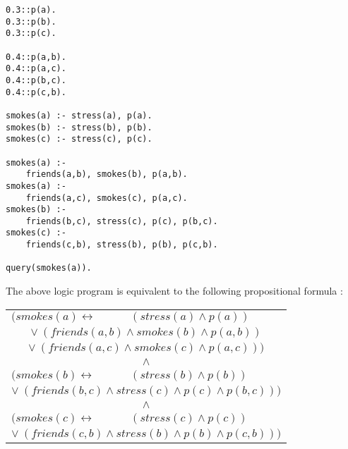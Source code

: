 \begin{multicols*}{2}
\begin{code}
\begin{verbatim}
0.3::p(a).
0.3::p(b).
0.3::p(c).

0.4::p(a,b).
0.4::p(a,c).
0.4::p(b,c).
0.4::p(c,b).

smokes(a) :- stress(a), p(a).
smokes(b) :- stress(b), p(b).
smokes(c) :- stress(c), p(c).

smokes(a) :- 
    friends(a,b), smokes(b), p(a,b).
smokes(a) :-
    friends(a,c), smokes(c), p(a,c).
smokes(b) :- 
    friends(b,c), stress(c), p(c), p(b,c).
smokes(c) :- 
    friends(c,b), stress(b), p(b), p(c,b).

query(smokes(a)).
\end{verbatim}
\label{code:base}
\vspace{0.5cm}
\end{code}

\noindent The above logic program is equivalent to the following propositional formula :
\begin{center}
\begin{tabular}{ll}
$(smokes(a)\leftrightarrow$ & $(stress(a) \land p(a))$\\
\multicolumn{2}{c}{$\lor\ (friends(a,b) \land smokes(b) \land p(a,b))$}\\
\multicolumn{2}{c}{$\lor\ (friends(a,c) \land smokes(c) \land p(a,c)))$}\\
\multicolumn{2}{c}{$\land$}\\
$(smokes(b)\leftrightarrow$ & $(stress(b) \land p(b))$\\
\multicolumn{2}{c}{$\lor\ (friends(b,c) \land stress(c) \land p(c) \land p(b,c)))$}\\
\multicolumn{2}{c}{$\land$}\\
$(smokes(c)\leftrightarrow$ & $(stress(c) \land p(c))$\\
\multicolumn{2}{c}{$\lor\ (friends(c,b) \land stress(b) \land p(b) \land p(c,b)))$}\\
\end{tabular}
\end{center}


\end{multicols*}
